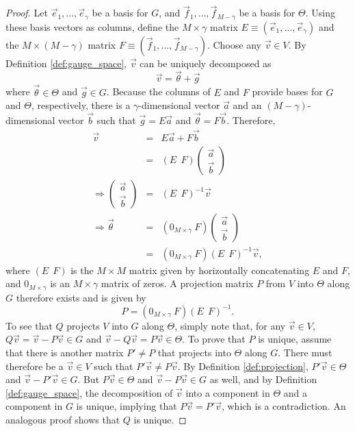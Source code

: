 \documentclass{article}
\numberwithin{myclaim}{section}
\begin{document}
\begin{proof}
Let $\vec{e}_1, \ldots, \vec{e}_\gamma$ be a basis for $G$, and $\vec{f}_1, \ldots, \vec{f}_{M-\gamma}$ be a basis for $\Theta$. Using these basis vectors as columns, define the $M \times \gamma$ matrix $E \equiv (\vec{e}_1, \ldots, \vec{e}_\gamma)$ and the $M \times (M-\gamma)$ matrix $F \equiv (\vec{f}_1, \ldots, \vec{f}_{M-\gamma})$. Choose any $\vec{v} \in V$. By Definition \ref{def:gauge_space}, $\vec{v}$ can be uniquely decomposed as
\begin{equation}
    \vec{v} = \vec{\theta} + \vec{g}
\end{equation}
where $\vec{\theta} \in \Theta$ and $\vec{g} \in G$. Because the columns of $E$ and $F$ provide bases for $G$ and $\Theta$, respectively, there is a $\gamma$-dimensional vector $\vec{a}$ and an $(M-\gamma)$-dimensional vector $\vec{b}$ such that $\vec{g} = E \vec{a}$ and $\vec{\theta} = F \vec{b}$. Therefore,
\begin{eqnarray}
    \vec{v} &=& E \vec{a} + F \vec{b} \\
    &=& \left( E~~F \right) \left( \begin{array}{c} \vec{a} \\ \vec{b} \end{array} \right) \\
    \Rightarrow \left( \begin{array}{c} \vec{a} \\ \vec{b} \end{array} \right)  &=& \left( E~~F \right)^{-1} \vec{v} \\
    \Rightarrow \vec{\theta} &=& \left( 0_{M \times \gamma}~F \right) \left( \begin{array}{c} \vec{a} \\ \vec{b} \end{array} \right) \\
    &=& (0_{M \times \gamma}~F)\left( E~~F \right)^{-1} \vec{v},
\end{eqnarray}
where $\left( E~~F \right)$ is the $M \times M$ matrix given by horizontally concatenating $E$ and $F$, and $0_{M \times \gamma}$ is an $M \times \gamma$ matrix of zeros. A projection matrix $P$ from $V$ into $\Theta$ along $G$ therefore exists and is given by
\begin{equation}
    P = (0_{M \times \gamma}~F)\left( E~~F \right)^{-1}.
\end{equation}
To see that $Q$ projects $V$ into $G$ along $\Theta$, simply note that, for any $\vec{v} \in V$, $Q \vec{v} = \vec{v} - P \vec{v} \in G$ and $\vec{v} - Q \vec{v} = P\vec{v} \in \Theta$. To prove that $P$ is unique, assume that there is another matrix $P' \neq P$ that projects into $\Theta$ along $G$. There must therefore be a $\vec{v} \in V$ such that $P' \vec{v} \neq P \vec{v}$. By Definition \ref{def:projection}, $P' \vec{v} \in \Theta$ and $\vec{v} - P' \vec{v} \in G$. But $P \vec{v} \in \Theta$ and $\vec{v} - P \vec{v} \in G$ as well, and by Definition \ref{def:gauge_space}, the decomposition of $\vec{v}$ into a component in $\Theta$ and a component in $G$ is unique, implying that $P \vec{v} = P' \vec{v}$, which is a contradiction. An analogous proof shows that $Q$ is unique. 
\end{proof}
\end{document}
